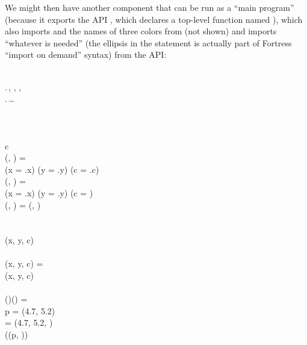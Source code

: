 We might then have another component that can be run as a ``main program''
(because it exports the API , which declares a top-level
function named ), which also imports  and the
names of three colors from  (not shown)
and imports ``whatever is needed'' (the ellipsis \EXP{\ldots} in the  statement
is actually part of Fortress ``import on demand'' syntax) from the  API:
\begin{codeexamplesize}
\begin{FortressCode}
  \\
 .\lbrace\,, , , \,\rbrace \\
 .\lbrace\,\ldots\,\rbrace \\
  \\
 \\
    \\
\2\+c\COLON {} \\
  (, \COLON {})\COLON {} = \\
  \2\+(x = .x) \wedge (y = .y) \wedge (c = .c)\- \\
  (, \COLON {})\COLON {} = \\
  \2\+(x = .x) \wedge (y = .y) \wedge (c = )\- \\
  (\COLON {}, )\COLON {} = (, )\- \\
 \\
 \\
 (x\COLON {}, y\COLON {}, c\COLON {})  \\
 \\
(x\COLON {}, y\COLON {}, c\COLON {}) = \\
\2\+(x, y, c) \\
\- \\
(\ultrathin)\COLON (\ultrathin) =\;  \\
\2\+p = (4.7, 5.2) \\
   = (4.7, 5.2, ) \\
  \bigl((p, )\bigr)\- \\
 \\
 \\
 
\end{FortressCode}
\end{codeexamplesize}

